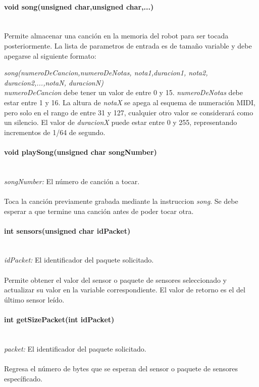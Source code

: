 \documentclass[letterpaper,openright,12pt]{book}
\begin{document}
\paragraph{	void song(unsigned char,unsigned char,...)}\mbox{}\\
Permite almacenar una canción en la memoria del robot para ser tocada posteriormente. La lista de parametros de entrada es de tamaño variable y debe apegarse al siguiente formato:

\emph{song(numeroDeCancion,numeroDeNotas, nota1,duracion1, nota2, duracion2,...,notaN, duracionN)}\\
\emph{numeroDeCancion} debe tener un valor de entre 0 y 15. \emph{numeroDeNotas} debe estar entre 1 y 16. La altura de \emph{notaX} se apega al esquema de numeración MIDI, pero solo en el rango de entre 31 y 127, cualquier otro valor se considerará como un silencio. El valor de \emph{duracionX} puede estar entre 0 y 255, representando incrementos de 1/64 de segundo.\\

\paragraph{void playSong(unsigned char songNumber)}\mbox{}\\
\emph{songNumber: } El número de canción a tocar.\\\\
Toca la canción previamente grabada mediante la instruccion \emph{song}. Se debe esperar a que termine una canción antes de poder tocar otra.\\

\paragraph{int sensors(unsigned char idPacket)}\mbox{}\\
\emph{idPacket: } El identificador del paquete solicitado.\\\\
Permite obtener el valor del sensor o paquete de sensores seleccionado y actualizar su valor en la variable correspondiente. El valor de retorno es el del último sensor leído.\\

\paragraph{int getSizePacket(int idPacket)}\mbox{}\\
\emph{packet: } El identificador del paquete solicitado.\\\\
Regresa el número de bytes que se esperan del sensor o paquete de sensores específicado.\\
\end{document}
